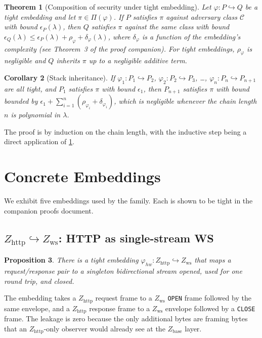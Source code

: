 \documentclass[11pt]{article}
\newtheorem{theorem}{Theorem}
\newtheorem{proposition}[theorem]{Proposition}
\newtheorem{corollary}[theorem]{Corollary}
\theoremstyle{definition}
\theoremstyle{remark}
\newcommand{\Zb}{Z_{\mathrm{base}}}
\newcommand{\Zh}{Z_{\mathrm{http}}}
\newcommand{\Zw}{Z_{\mathrm{ws}}}
\begin{document}
\begin{theorem}[Composition of security under tight embedding]
\label{thm:composition}
Let $\varphi : P \hookrightarrow Q$ be a tight embedding and let
$\pi \in \Pi(\varphi)$. If $P$ satisfies $\pi$ against adversary
class $\mathcal{C}$ with bound $\epsilon_P(\lambda)$, then $Q$
satisfies $\pi$ against the same class with bound
$\epsilon_Q(\lambda) \le \epsilon_P(\lambda) + \rho_\varphi
+ \delta_\varphi(\lambda)$, where $\delta_\varphi$ is a function of
the embedding's complexity (see Theorem~3 of the proof companion).
For tight embeddings, $\rho_\varphi$ is negligible and $Q$ inherits
$\pi$ up to a negligible additive term.
\end{theorem}

\begin{corollary}[Stack inheritance]
\label{cor:stack}
If $\varphi_1 : P_1 \hookrightarrow P_2$, $\varphi_2 : P_2
\hookrightarrow P_3$, \ldots, $\varphi_n : P_n \hookrightarrow
P_{n+1}$ are all tight, and $P_1$ satisfies $\pi$ with bound
$\epsilon_1$, then $P_{n+1}$ satisfies $\pi$ with bound bounded by
$\epsilon_1 + \sum_{i=1}^n (\rho_{\varphi_i} + \delta_{\varphi_i})$,
which is negligible whenever the chain length $n$ is polynomial in
$\lambda$.
\end{corollary}

The proof is by induction on the chain length, with the inductive
step being a direct application of \cref{thm:composition}.

\section{Concrete Embeddings}
\label{sec:instances}

We exhibit five embeddings used by the family. Each is shown to be
tight in the companion proofs document.

\subsection{$\Zh \hookrightarrow \Zw$: HTTP as single-stream WS}

\begin{proposition}
\label{prop:http-ws}
There is a tight embedding $\varphi_{hw} : \Zh \hookrightarrow \Zw$
that maps a request/response pair to a singleton bidirectional stream
opened, used for one round trip, and closed.
\end{proposition}

The embedding takes a $\Zh$ request frame to a $\Zw$ \texttt{OPEN}
frame followed by the same envelope, and a $\Zh$ response frame to a
$\Zw$ envelope followed by a \texttt{CLOSE} frame. The leakage is
zero because the only additional bytes are framing bytes that an
$\Zh$-only observer would already see at the $\Zb$ layer.
\end{document}
